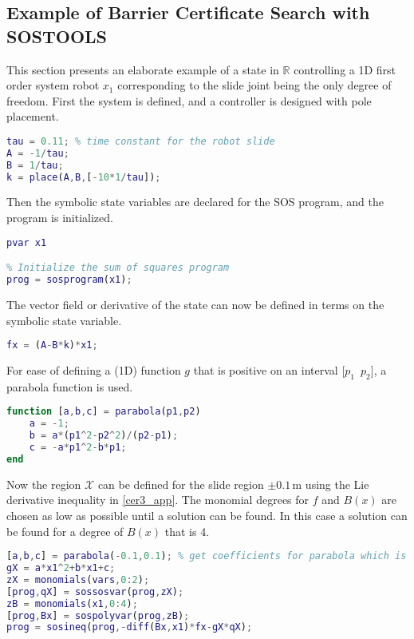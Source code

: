 \subsection{Example of Barrier Certificate Search with SOSTOOLS}
This section presents an elaborate example of a state in $\mathbb{R}$ controlling a 1D first order system robot $x_1$ corresponding to the slide joint being the only degree of freedom. First the system is defined, and a controller is designed with pole placement.
\begin{lstlisting}[language=matlab]
% Define state-space system with x1 = robot position
tau = 0.11; % time constant for the robot slide
A = -1/tau;
B = 1/tau;
k = place(A,B,[-10*1/tau]);
\end{lstlisting}
Then the symbolic state variables are declared for the SOS program, and the program is initialized.
\begin{lstlisting}[language=matlab]
% Declare state variables
pvar x1

% Initialize the sum of squares program
prog = sosprogram(x1);
\end{lstlisting}
The vector field or derivative of the state can now be defined in terms on the symbolic state variable.
\begin{lstlisting}[language=matlab]
% Vector field dx/dt = fx (closed loop)
fx = (A-B*k)*x1;
\end{lstlisting}
For ease of defining a (1D) function $g$ that is positive on an interval [$p_1\,\,\, p_2$], a parabola function is used.
\begin{lstlisting}[language=matlab]
function [a,b,c] = parabola(p1,p2)
	a = -1;
	b = a*(p1^2-p2^2)/(p2-p1);
	c = -a*p1^2-b*p1;
end
\end{lstlisting}
Now the region $\mathcal{X}$ can be defined for the slide region $\pm0.1$\,m using the Lie derivative inequality in \autoref{cer3_app}. The monomial degrees for $f$ and $B(x)$ are chosen as low as possible until a solution can be found. In this case a solution can be found for a degree of $B(x)$ that is 4.
\begin{lstlisting}[language=matlab]
% Define space X in R^n
[a,b,c] = parabola(-0.1,0.1); % get coefficients for parabola which is positive for x in [-0.1,0.1]
gX = a*x1^2+b*x1+c;
zX = monomials(vars,0:2);
[prog,qX] = sossosvar(prog,zX);
zB = monomials(x1,0:4);
[prog,Bx] = sospolyvar(prog,zB);
prog = sosineq(prog,-diff(Bx,x1)*fx-gX*qX);
\end{lstlisting}
